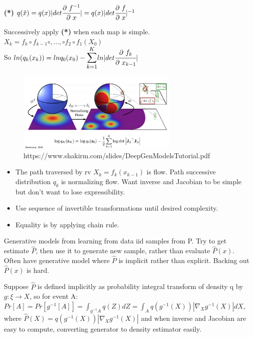 \documentclass[12pt,a4paper]{article}
\begin{document}
\textbf{(*)} $q(\tilde{x})=q(x)|det\cfrac{\partial\ f^{-1}}{\partial\ x}|=q(x)|det\cfrac{\partial\ f}{\partial\ x}|^{-1}$

Successively apply \textbf{(*)} when each map is simple. \\
$X_k=f_k \circ f_{k-1} \circ, ..., \circ f_2 \circ f_1 (X_0)$\\
So $ln(q_k(x_k))=ln q_0(x_0)-\bsum{k=1}{K}ln|det\pfrac{f_k}{x_{k-1}}|$

\begin{figure}[!ht]
    \centering
    \includegraphics[width=0.7\textwidth]{fig/norm_flow_eq.jpg}
    \caption{https://www.shakirm.com/slides/DeepGenModelsTutorial.pdf}
\end{figure}

\begin{itemize}
\item The path traversed by rv $X_k=f_k(x_{k-1})$ is flow. Path successive distribution {$q_k$} is normalizing flow. 
Want inverse and Jacobian to be simple but don't want to lose expressibility. 
\item Use sequence of invertible transformations until desired complexity. 
\item Equality is by applying chain rule. 
\end{itemize}

Generative models from learning from data iid samples from P. Try to get estimate $\hat{P}$, then use it to generate new sample, rather than evaluate $\hat{P}(x)$. Often have generative model where 
$\hat{P}$ is implicit rather than explicit. Backing out $\hat{P}(x)$ is hard. 

Suppose $\hat{P}$ is defined implicitly as probability integral transform of density q by $g: \xi\rightarrow X$, so for event A: \\
$Pr[A]=Pr[g^{-1}[A]]=\int_{g^{-1}{A}}q(Z)dZ=\int_A q(g^{-1}(X))|\nabla_Xg^{-1}(X)|dX$, \\
where $\hat{P}(X)=q(g^{-1}(X))|\nabla_Xg^{-1}(X)|$ and when inverse and Jacobian are easy to compute, converting generator to density estimator easily. 
\end{document}
